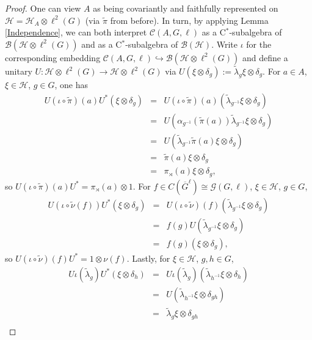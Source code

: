 \documentclass[a4paper,11pt,reqno]{amsart}
\numberwithin{equation}{section}
\numberwithin{equation}{section}
\theoremstyle{definition}
\theoremstyle{remark}
\theoremstyle{remark}
\begin{document}
\begin{proof} One can view $A$ as being covariantly and faithfully
represented on $\mathcal{H}=\mathcal{H}_{A}\otimes\ell^{2}(G)$ (via
$\widetilde{\pi}$ from before). In turn, by applying Lemma \ref{Independence},
we can both interpret $\mathcal{C}(A,G,\ell)$ as a C$^{\ast}$-subalgebra
of $\mathcal{B}(\mathcal{H}\otimes\ell^{2}(G))$ and as a C$^{\ast}$-subalgebra
of $\mathcal{B}(\mathcal{H})$. Write $\iota$ for the corresponding
embedding $\mathcal{C}(A,G,\ell)\hookrightarrow\mathcal{B}(\mathcal{H}\otimes\ell^{2}(G))$
and define a unitary $U:\mathcal{H}\otimes\ell^{2}(G)\rightarrow\mathcal{H}\otimes\ell^{2}(G)$
via $U(\xi\otimes\delta_{g}):=\widetilde{\lambda}_{g}\xi\otimes\delta_{g}$.
For $a\in A$, $\xi\in\mathcal{H}$, $g\in G$, one has
\begin{eqnarray*}
U(\iota\circ\widetilde{\pi})(a)U^{\ast}(\xi\otimes\delta_{g}) & = & U(\iota\circ\widetilde{\pi})(a)(\widetilde{\lambda}_{g^{-1}}\xi\otimes\delta_{g})\\
 & = & U(\alpha_{g^{-1}}(\widetilde{\pi}(a))\widetilde{\lambda}_{g^{-1}}\xi\otimes\delta_{g})\\
 & = & U(\widetilde{\lambda}_{g^{-1}}\widetilde{\pi}(a)\xi\otimes\delta_{g})\\
 & = & \widetilde{\pi}(a)\xi\otimes\delta_{g} \\
\nonumber
&=& \pi_{\rtimes}(a)\xi\otimes\delta_{g},
\end{eqnarray*}
so $U(\iota\circ\widetilde{\pi})(a)U^{\ast}=\pi_{\rtimes}(a)\otimes1$.
For $f\in C(\overline{G}^{\ell})\cong \mathcal{G}(G,\ell)$, $\xi\in\mathcal{H}$,
$g\in G$, 
\begin{eqnarray*}
U(\iota\circ\widetilde{\nu}(f))U^{\ast}(\xi\otimes\delta_{g}) & = & U(\iota\circ\widetilde{\nu})(f)(\widetilde{\lambda}_{g^{-1}}\xi\otimes\delta_{g})\\
 & = & f(g)U(\widetilde{\lambda}_{g^{-1}}\xi\otimes\delta_{g})\\
 & = & f(g)(\xi\otimes\delta_{g}),
\end{eqnarray*}
so $U(\iota\circ\widetilde{\nu})(f)U^{\ast}=1\otimes\nu(f)$. Lastly,
for $\xi\in\mathcal{H}$, $g,h\in G$, 
\begin{eqnarray*}
U\iota(\widetilde{\lambda}_{g})U^{\ast}(\xi\otimes\delta_{h}) & = & U\iota(\widetilde{\lambda}_{g})(\widetilde{\lambda}_{h^{-1}}\xi\otimes\delta_{h})\\
 & = & U(\widetilde{\lambda}_{h^{-1}}\xi\otimes\delta_{gh})\\
 & = & \widetilde{\lambda}_{g}\xi\otimes\delta_{gh} \\

\end{eqnarray*}
\end{proof}
\end{document}
